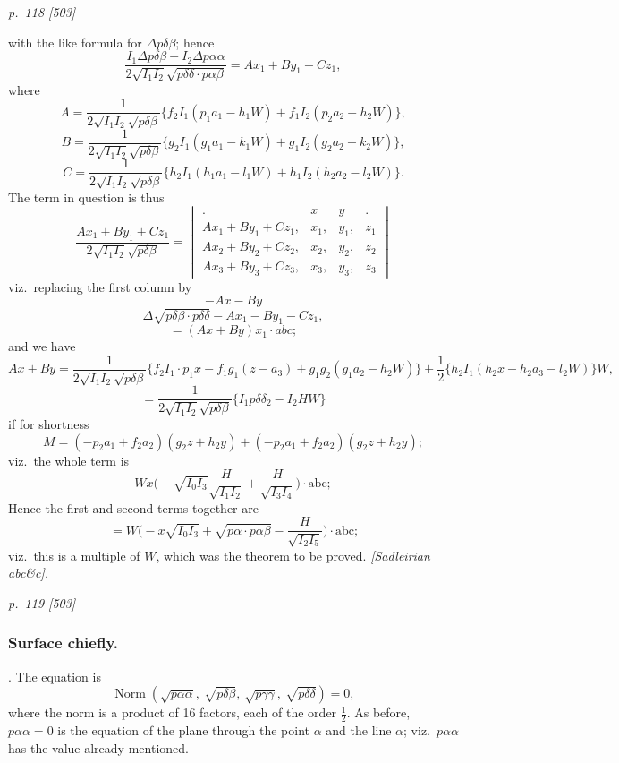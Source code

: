 \documentclass[11pt,a4paper]{book}
\begin{document}
\clearpage

\bigskip
\textit{p.~118 [503]}
\smallskip

\noindent
with the like formula for $\Delta p\delta\beta$; hence
\[
\frac{I_1 \Delta p\delta\beta + I_2 \Delta p\alpha\alpha}{2\sqrt{I_1 I_2}\sqrt{p\delta\delta\cdot p\alpha\beta}} = A x_1 + B y_1 + C z_1,
\]
where
\[
A = \frac{1}{2\sqrt{I_1 I_2}\sqrt{p\delta\beta}} \{f_2 I_1(p_1 a_1 - h_1 W) + f_1 I_2(p_2 a_2 - h_2 W)\},
\]
\[
B = \frac{1}{2\sqrt{I_1 I_2}\sqrt{p\delta\beta}} \{g_2 I_1(g_1 a_1 - k_1 W) + g_1 I_2(g_2 a_2 - k_2 W)\},
\]
\[
C = \frac{1}{2\sqrt{I_1 I_2}\sqrt{p\delta\beta}} \{h_2 I_1(h_1 a_1 - l_1 W) + h_1 I_2(h_2 a_2 - l_2 W)\}.
\]
The term in question is thus
\[
\frac{A x_1 + B y_1 + C z_1}{2\sqrt{I_1 I_2}\sqrt{p\delta\beta}} =
\begin{vmatrix}
. & x & y & . \\
A x_1 + B y_1 + C z_1, & x_1, & y_1, & z_1 \\
A x_2 + B y_2 + C z_2, & x_2, & y_2, & z_2 \\
A x_3 + B y_3 + C z_3, & x_3, & y_3, & z_3
\end{vmatrix}
\]
viz.\ replacing the first column by
\[
-Ax-By
\]
\[
\Delta \sqrt{p\delta\beta\cdot p\delta\delta} - Ax_1 - By_1 - Cz_1,
\]
\[
= (Ax + By)x_1\cdot abc;
\]
and we have
\[
Ax + By = \frac{1}{2\sqrt{I_1 I_2}\sqrt{p\delta\beta}}\{f_2 I_1\cdot p_1 x - f_1 g_1(z - a_3) + g_1 g_2(g_1 a_2 - h_2 W)\}+\frac{1}{2}\{h_2 I_1(h_2 x - h_2 a_3 - l_2 W)\} W,
\]
\[
= \frac{1}{2\sqrt{I_1 I_2}\sqrt{p\delta\beta}}\{I_1 p\delta\delta_2 - I_2 H W\}
\]
if for shortness
\[
M = (-p_2 a_1 + f_2 a_2)(g_2 z + h_2 y) + (-p_2 a_1 + f_2 a_2)(g_2 z + h_2 y);
\]
viz.\ the whole term is
\[
W x \biggl(-\sqrt{I_0 I_3}\frac{H}{\sqrt{I_1 I_2}}+\frac{H}{\sqrt{I_3 I_4}}\biggr) \cdot \text{abc};
\]
Hence the first and second terms together are
\[
= W\biggl(-x \sqrt{I_0 I_3} + \sqrt{p\alpha\cdot p\alpha\beta} - \frac{H}{\sqrt{I_2 I_5}}\biggr)
\cdot \text{abc;}
\]
viz.\ this is a multiple of $W$, which was the theorem to be proved.
\textit{[Sadleirian abc\&c].}

\clearpage

\bigskip
\textit{p.~119 [503]}
\smallskip

\subsubsection*{Surface chiefly.}

. The equation is
\[
\operatorname{Norm}\left(\sqrt{p\alpha\alpha},\ \sqrt{p\delta\beta},\ \sqrt{p\gamma\gamma},\ \sqrt{p\delta\delta}\right) = 0,
\]
where the norm is a product of 16 factors, each of the order $\tfrac{1}{2}$. As before, $p\alpha\alpha = 0$
is the equation of the plane through the point $\alpha$ and the line $\alpha$; viz.\ $p\alpha\alpha$ has the
value already mentioned.
\end{document}

